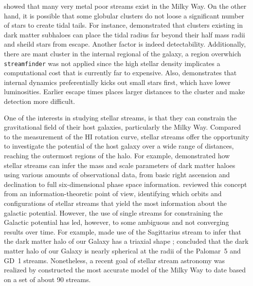\documentclass{aa}
\begin{document}
  \citet{2022MNRAS.516.5331M} showed that many very metal poor streams exist in the Milky Way. On the other hand, it is possible that some globular clusters do not loose a significant number of stars to create tidal tails. For instance, \citet{2022A&A...667A.112V} demonstrated that clusters existing in dark matter subhaloes can place the tidal radius far beyond their half mass radii and sheild stars from escape. Another factor is indeed detectability. Additionally, there are mant cluster in the internal regional of the galaxy, a region overwhich \texttt{streamfinder} was not applied since the high stellar density implicates a computational cost that is currently far to expensive. Also, \citet{2018MNRAS.474.2479B} demonstrates that internal dynamics preferentially kicks out small stars first, which have lower luminosities. Earlier escape times places larger distances to the cluster and make detection more difficult. 
  
  
  One of the interests in studying stellar streams, is that they can constrain the gravitational field of their host galaxies, particularly the Milky Way. Compared to the measurement of the HI rotation curve, stellar streams offer the opportunity to investigate the potential of the host galaxy over a wide range of distances, reaching the outermost regions of the halo. For example, \citet{2011MNRAS.417..198V} demonstrated how stellar streams can infer the mass and scale parameters of dark matter haloes using various amounts of observational data, from basic right ascension and declination to full six-dimensional phase space information. \citet{2018ApJ...867..101B} reviewed this concept from an information-theoretic point of view, identifying which orbits and configurations of stellar streams that yield the most information about the galactic potential. However, the use of single streams for constraining the Galactic potential has led, however, to some ambiguous and not converging results over time. For example, \citet{2010ApJ...718.1128L} made use of the Sagittarius stream to infer that the dark matter halo of our Galaxy has a triaxial shape \citep[but see also][]{2004MNRAS.351..643H, johnston05, 2005ApJ...619..807L}; \citet{2016ApJ...833...31B} concluded that the dark matter halo of our Galaxy is nearly spherical at the radii of the Palomar~5 and GD~1 streams. Nonetheless, a recent goal of stellar stream astronomy was realized by \citet{2024ApJ...967...89I} constructed the most accurate model of the Milky Way to date based on a set of about 90 streams. 
\end{document}
